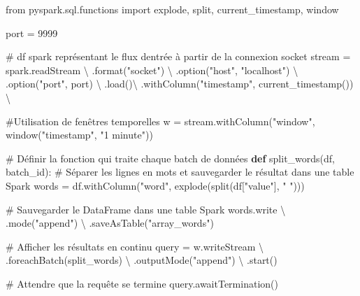 \documentclass[
  letterpaper,
  DIV=11,
  numbers=noendperiod]{scrartcl}
\newenvironment{Shaded}{\begin{snugshade}}{\end{snugshade}}
\newcommand{\BuiltInTok}[1]{\textcolor[rgb]{0.00,0.23,0.31}{#1}}
\newcommand{\CommentTok}[1]{\textcolor[rgb]{0.37,0.37,0.37}{#1}}
\newcommand{\DecValTok}[1]{\textcolor[rgb]{0.68,0.00,0.00}{#1}}
\newcommand{\ImportTok}[1]{\textcolor[rgb]{0.00,0.46,0.62}{#1}}
\newcommand{\KeywordTok}[1]{\textcolor[rgb]{0.00,0.23,0.31}{\textbf{#1}}}
\newcommand{\NormalTok}[1]{\textcolor[rgb]{0.00,0.23,0.31}{#1}}
\newcommand{\OperatorTok}[1]{\textcolor[rgb]{0.37,0.37,0.37}{#1}}
\newcommand{\StringTok}[1]{\textcolor[rgb]{0.13,0.47,0.30}{#1}}
\begin{document}
\begin{Shaded}
\begin{Highlighting}[]
\ImportTok{from}\NormalTok{ pyspark.sql.functions }\ImportTok{import}\NormalTok{ explode, split, current\_timestamp, window}

\NormalTok{port }\OperatorTok{=} \DecValTok{9999}

\CommentTok{\# df spark représentant le flux d\textquotesingle{}entrée à partir de la connexion socket}
\NormalTok{stream }\OperatorTok{=}\NormalTok{ spark.readStream }\OperatorTok{\textbackslash{}}
\NormalTok{    .}\BuiltInTok{format}\NormalTok{(}\StringTok{"socket"}\NormalTok{) }\OperatorTok{\textbackslash{}}
\NormalTok{    .option(}\StringTok{"host"}\NormalTok{, }\StringTok{"localhost"}\NormalTok{) }\OperatorTok{\textbackslash{}}
\NormalTok{    .option(}\StringTok{"port"}\NormalTok{, port) }\OperatorTok{\textbackslash{}}
\NormalTok{    .load()}\OperatorTok{\textbackslash{}}
\NormalTok{    .withColumn(}\StringTok{"timestamp"}\NormalTok{, current\_timestamp()) }\OperatorTok{\textbackslash{}}

\CommentTok{\#Utilisation de fenêtres temporelles}
\NormalTok{w }\OperatorTok{=}\NormalTok{ stream.withColumn(}\StringTok{"window"}\NormalTok{, window(}\StringTok{"timestamp"}\NormalTok{, }\StringTok{"1 minute"}\NormalTok{))}

\CommentTok{\# Définir la fonction qui traite chaque batch de données}
\KeywordTok{def}\NormalTok{ split\_words(df, batch\_id):}
    \CommentTok{\# Séparer les lignes en mots et sauvegarder le résultat dans une table Spark}
\NormalTok{    words }\OperatorTok{=}\NormalTok{ df.withColumn(}\StringTok{"word"}\NormalTok{, explode(split(df[}\StringTok{"value"}\NormalTok{], }\StringTok{" "}\NormalTok{)))}
    
    \CommentTok{\# Sauvegarder le DataFrame dans une table Spark}
\NormalTok{    words.write }\OperatorTok{\textbackslash{}}
\NormalTok{        .mode(}\StringTok{"append"}\NormalTok{) }\OperatorTok{\textbackslash{}}
\NormalTok{        .saveAsTable(}\StringTok{"array\_words"}\NormalTok{)}

\CommentTok{\# Afficher les résultats en continu}
\NormalTok{query }\OperatorTok{=}\NormalTok{ w.writeStream }\OperatorTok{\textbackslash{}}
\NormalTok{            .foreachBatch(split\_words) }\OperatorTok{\textbackslash{}}
\NormalTok{            .outputMode(}\StringTok{"append"}\NormalTok{) }\OperatorTok{\textbackslash{}}
\NormalTok{            .start()}

\CommentTok{\# Attendre que la requête se termine}
\NormalTok{query.awaitTermination()}
\end{Highlighting}
\end{Shaded}
\end{document}
